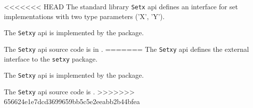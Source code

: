 
<<<<<<< HEAD
The standard library {\tt Setx} api defines an interface for set implementations with two type parameters ('X', 'Y').

The {\tt Setxy} api is implemented by the 
 package.

The {\tt Setxy} api source code is in .
=======
The {\tt Setxy} api defines the external interface to the {\tt setxy} package.

The {\tt Setxy} api is implemented by the  package.

The {\tt Setxy} api source code is .
>>>>>>> 656624e1e7dcd3699659bb5c5e2eeabb2b44bfea
